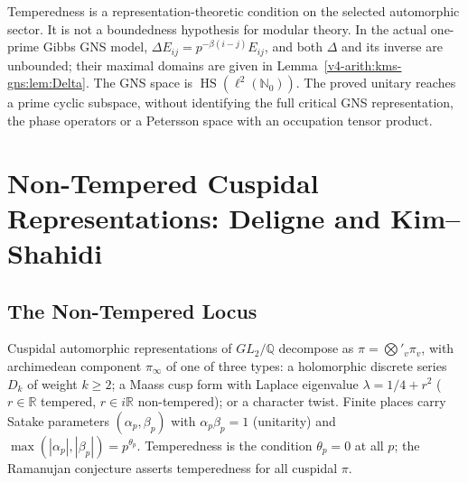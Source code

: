 \begin{remark}
\label{v4-arith:w5-c:rem:baseline}
Temperedness is a representation-theoretic condition on the
selected automorphic sector. It is not a boundedness hypothesis
for modular theory. In the actual one-prime Gibbs GNS model,
\(\Delta E_{ij}=p^{-\beta(i-j)}E_{ij}\), and both \(\Delta\) and
its inverse are unbounded; their maximal domains are given in
Lemma~\ref{v4-arith:kms-gns:lem:Delta}.
The GNS space is \(\operatorname{HS}(\ell^2(\mathbb N_0))\).
The proved unitary reaches a prime cyclic subspace, without
identifying the full critical GNS representation, the phase
operators or a Petersson space with an occupation tensor product.
\end{remark}

\section{Non-Tempered Cuspidal Representations: Deligne and Kim--Shahidi}
\label{v4-arith:w5-c:non-tempered}

\subsection{The Non-Tempered Locus}
\label{v4-arith:w5-c:non-tempered:locus}

Cuspidal automorphic representations of \(GL_{2}/\mathbb{Q}\) decompose
as \(\pi=\bigotimes'_{v}\pi_{v}\), with archimedean component \(\pi_{\infty}\)
of one of three types: a holomorphic discrete series \(D_{k}\) of
weight \(k\geq 2\); a Maass cusp form with Laplace eigenvalue
\(\lambda=1/4+r^{2}\) (\(r\in\mathbb{R}\) tempered, \(r\in i\mathbb{R}\)
non-tempered); or a character twist. Finite places carry Satake
parameters \((\alpha_{p},\beta_{p})\) with \(\alpha_{p}\beta_{p}=1\)
(unitarity) and \(\max(|\alpha_{p}|,|\beta_{p}|)=p^{\theta_{p}}\).
Temperedness is the condition \(\theta_{p}=0\) at all \(p\); the
Ramanujan conjecture asserts temperedness for all cuspidal \(\pi\).

